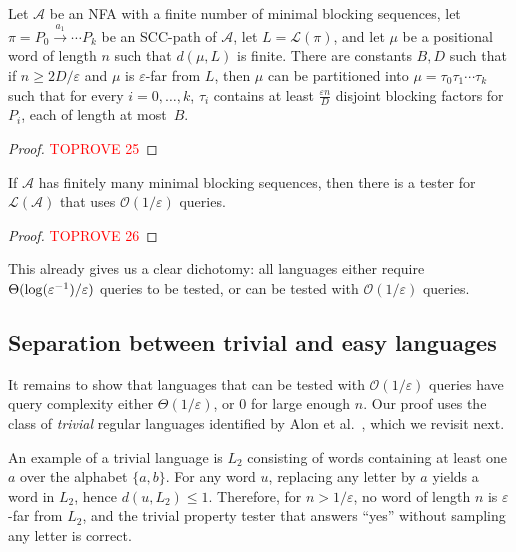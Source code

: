 \documentclass[letterpaper, USenglish, cleveref, autoref, thm-restate, numberwithinsect]{lipics-v2021}
\theoremstyle{theorem}
\theoremstyle{definition}
\newcommand{\Aa}{\mathcal{A}}
\newcommand{\cO}{\mathcal{O}}
\newcommand{\eps}{\varepsilon}
\newcommand{\lang}[1]{\mathcal{L}(#1)}
\newcommand{\SCCpath}{\pi}
\newcommand{\set}[1]{\{ #1 \}}
\newcommand{\epslogeps}[1][]
{\ifthenelse{\equal{#1}{}}{\log(\eps^{-1})/\eps}{\log^{ #1 }(\eps^{-1})/\eps}}
\begin{document}
\begin{lemma}\label{lem:far-bounded-mbs}
	Let $\Aa$ be an NFA with a finite number of minimal blocking sequences,
    let~$\SCCpath  = P_0 \xrightarrow{a_1} \cdots  P_k$ be an SCC-path of $\Aa$, let $L = \lang{\SCCpath}$, and let $\mu$ be a positional word of length $n$ such that $d(\mu, L)$ is finite.
    There are constants $B, D$ such that if $n \geq 2D/\eps$
    and $\mu$ is $\eps$-far from $L$, then $\mu$ can be partitioned into $\mu = \tau_0\tau_1\cdots\tau_k$ such that for every $i = 0,\ldots, k$,
    $\tau_i$ contains at least $\frac{\eps n}{D}$ disjoint blocking factors for~$P_i$, each of length at most~$B$.
\end{lemma}
\begin{proof}\textcolor{red}{TOPROVE 25}\end{proof}

\begin{proposition}
	\label{coro:fin-bs-then-easy}
	If $\Aa$ has finitely many minimal blocking sequences, then there is a tester for $\lang{\Aa}$ that uses $\cO(1/\eps)$ queries.
\end{proposition}
\begin{proof}\textcolor{red}{TOPROVE 26}\end{proof}

This already gives us a clear dichotomy: all languages either require $\Theta(\epslogeps)$ queries to be tested, or can be tested with $\cO(1/\eps)$ queries.


\subsection{Separation between trivial and easy languages}

It remains to show that languages that can be tested with $\cO(1/\eps)$ queries have query complexity either $\Theta(1/\eps)$, or $0$ for large enough $n$.
Our proof uses the class of \emph{trivial} regular languages identified by Alon et al.~\cite{alon2001regular}, which we revisit next.

An example of a trivial language is $L_2$ consisting of words containing at least one $a$ over the alphabet $\set{a,b}$.
For any word $u$, replacing any letter by $a$ yields a word in $L_2$, hence $d(u,L_2) \le 1$.
Therefore, for $n > 1/\eps$, no word of length $n$ is $\eps$-far from $L_2$, and the trivial property tester that answers ``yes'' without sampling any letter is correct.
\end{document}

